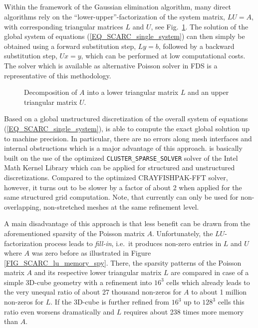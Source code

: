 \subsection{\uglmat}
Within the framework of the Gaussian elimination algorithm, many direct algorithms rely on the ``lower-upper''-factorization of the system matrix, $LU = A$, 
with corresponding triangular matrices $L$ and $U$, see Fig.~\ref{FIG_SCARC_lu_decomposition}. 
The solution of the global system of equations  (\ref{EQ_SCARC_single_system}) can then simply be obtained using a forward substitution step, $Ly=b$, followed by a backward substitution step, $Ux=y$, which can be performed at low computational costs.
The solver \uglmat{} which is available as alternative Poisson solver in FDS is a representative of this methodology.
\begin{figure}[h]
\begin{center}

\end{center}
\caption{Decomposition of $A$ into a lower triangular matrix $L$ and an upper triangular matrix $U$.}
\label{FIG_SCARC_lu_decomposition}
\end{figure}

Based on a global unstructured discretization of the overall system of equations (\ref{EQ_SCARC_single_system}), \uglmat{} is able to compute the exact global solution up to machine precision. In particular, there are no errors along mesh interfaces and internal obstructions which is a major advantage of this approach. 
\uglmat{} is basically built on the use of the optimized {\tt CLUSTER\_SPARSE\_SOLVER} solver of the Intel\textsuperscript{\textregistered} Math Kernel Library which can be applied for structured and unstructured discretizations. 
Compared to the optimized CRAYFISHPAK-FFT solver, however, it turns out to be slower by a factor of about 2 when applied for the same structured grid computation.
Note, that \uglmat{} currently can only be used for non-overlapping, non-stretched meshes at the same refinement level.

A main disadvantage of this approach is that less benefit can be drawn from the aforementioned sparsity of the Poisson matrix $A$. Unfortunately, the $LU$-factorization process leads to {\it fill-in}, i.e.\ it produces non-zero entries in $L$ and $U$ where $A$ was zero before as illustrated in Figure \ref{FIG_SCARC_lu_memory_spy}. There, the sparsity patterns of the Poisson matrix $A$
and its respective lower triangular matrix $L$ are compared in case of a simple 3D-cube geometry with a refinement into $16^3$ cells which already leads to the very unequal ratio of about 27 thousand non-zeros for $A$ to about 1 million non-zeros for $L$.
If the 3D-cube is further refined from $16^3$ up to $128^3$ cells this ratio even worsens dramatically and $L$ requires about 238 times more memory than $A$. 

